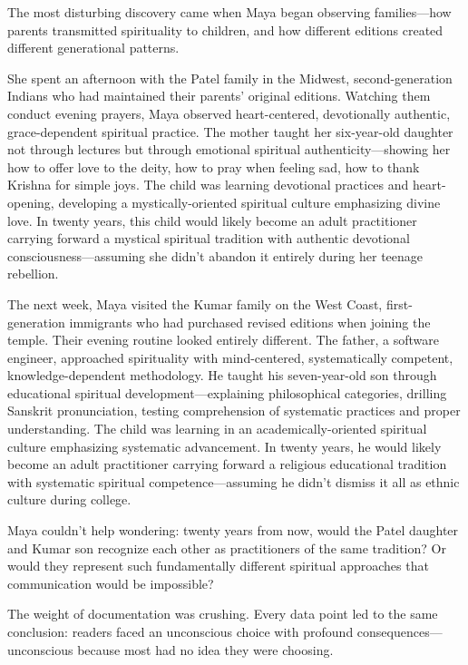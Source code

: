 \documentclass[12pt,twoside]{book}
\begin{document}
The most disturbing discovery came when Maya began observing families—how parents transmitted spirituality to children, and how different editions created different generational patterns.

She spent an afternoon with the Patel family in the Midwest, second-generation Indians who had maintained their parents' original editions. Watching them conduct evening prayers, Maya observed heart-centered, devotionally authentic, grace-dependent spiritual practice. The mother taught her six-year-old daughter not through lectures but through emotional spiritual authenticity—showing her how to offer love to the deity, how to pray when feeling sad, how to thank Krishna for simple joys. The child was learning devotional practices and heart-opening, developing a mystically-oriented spiritual culture emphasizing divine love. In twenty years, this child would likely become an adult practitioner carrying forward a mystical spiritual tradition with authentic devotional consciousness—assuming she didn't abandon it entirely during her teenage rebellion.

The next week, Maya visited the Kumar family on the West Coast, first-generation immigrants who had purchased revised editions when joining the temple. Their evening routine looked entirely different. The father, a software engineer, approached spirituality with mind-centered, systematically competent, knowledge-dependent methodology. He taught his seven-year-old son through educational spiritual development—explaining philosophical categories, drilling Sanskrit pronunciation, testing comprehension of systematic practices and proper understanding. The child was learning in an academically-oriented spiritual culture emphasizing systematic advancement. In twenty years, he would likely become an adult practitioner carrying forward a religious educational tradition with systematic spiritual competence—assuming he didn't dismiss it all as ethnic culture during college.

Maya couldn't help wondering: twenty years from now, would the Patel daughter and Kumar son recognize each other as practitioners of the same tradition? Or would they represent such fundamentally different spiritual approaches that communication would be impossible?

The weight of documentation was crushing. Every data point led to the same conclusion: readers faced an unconscious choice with profound consequences—unconscious because most had no idea they were choosing.
\end{document}
